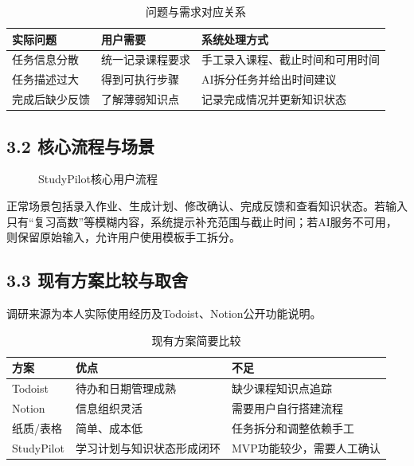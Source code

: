 \documentclass[UTF8,12pt,a4paper]{ctexart}
\begin{document}
\begin{table}[htbp]
\centering
\caption{问题与需求对应关系}
\begin{tabular}{p{3.3cm}p{4.5cm}p{5.2cm}}
\toprule
实际问题 & 用户需要 & 系统处理方式 \\
\midrule
任务信息分散 & 统一记录课程要求 & 手工录入课程、截止时间和可用时间 \\
任务描述过大 & 得到可执行步骤 & AI拆分任务并给出时间建议 \\
完成后缺少反馈 & 了解薄弱知识点 & 记录完成情况并更新知识状态 \\
\bottomrule
\end{tabular}
\end{table}

\subsection*{3.2 核心流程与场景}

\begin{figure}[htbp]
\centering
{}
\caption{StudyPilot核心用户流程}
\end{figure}

正常场景包括录入作业、生成计划、修改确认、完成反馈和查看知识状态。若输入只有“复习高数”等模糊内容，系统提示补充范围与截止时间；若AI服务不可用，则保留原始输入，允许用户使用模板手工拆分。

\subsection*{3.3 现有方案比较与取舍}

调研来源为本人实际使用经历及Todoist、Notion公开功能说明。

\begin{table}[htbp]
\centering
\caption{现有方案简要比较}
\begin{tabular}{p{2.5cm}p{4.3cm}p{6.2cm}}
\toprule
方案 & 优点 & 不足 \\
\midrule
Todoist & 待办和日期管理成熟 & 缺少课程知识点追踪 \\
Notion & 信息组织灵活 & 需要用户自行搭建流程 \\
纸质/表格 & 简单、成本低 & 任务拆分和调整依赖手工 \\
StudyPilot & 学习计划与知识状态形成闭环 & MVP功能较少，需要人工确认 \\
\bottomrule
\end{tabular}
\end{table}
\end{document}

